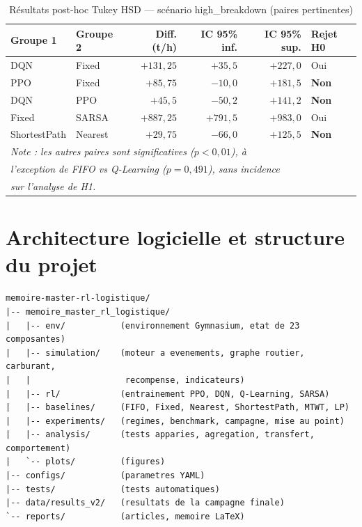\documentclass[11pt,a4paper]{report}
\begin{document}
\begin{table}[H]
\centering
\caption{Résultats post-hoc Tukey HSD — scénario high\_breakdown (paires pertinentes)}
\label{tab:tukey-highbreakdown}
\small
\begin{tabular}{llrrrl}
\toprule
\textbf{Groupe 1} & \textbf{Groupe 2} & \textbf{Diff. (t/h)} & \textbf{IC 95\% inf.} & \textbf{IC 95\% sup.} & \textbf{Rejet H0} \\
\midrule
DQN   & Fixed   & $+131{,}25$ & $+35{,}5$  & $+227{,}0$ & Oui \\
PPO   & Fixed   & $+85{,}75$  & $-10{,}0$  & $+181{,}5$ & \textbf{Non} \\
DQN   & PPO     & $+45{,}5$   & $-50{,}2$  & $+141{,}2$ & \textbf{Non} \\
Fixed & SARSA   & $+887{,}25$ & $+791{,}5$ & $+983{,}0$ & Oui \\
ShortestPath & Nearest & $+29{,}75$ & $-66{,}0$ & $+125{,}5$ & \textbf{Non} \\
\midrule
\multicolumn{6}{l}{\textit{Note : les autres paires sont significatives ($p < 0{,}01$), à}} \\
\multicolumn{6}{l}{\textit{l'exception de FIFO vs Q-Learning ($p = 0{,}491$), sans incidence}} \\
\multicolumn{6}{l}{\textit{sur l'analyse de H1.}} \\
\bottomrule
\end{tabular}
\end{table}

\chapter{Architecture logicielle et structure du projet}
\label{ann:architecture}

\begin{verbatim}
memoire-master-rl-logistique/
|-- memoire_master_rl_logistique/
|   |-- env/           (environnement Gymnasium, etat de 23 composantes)
|   |-- simulation/    (moteur a evenements, graphe routier, carburant,
|   |                   recompense, indicateurs)
|   |-- rl/            (entrainement PPO, DQN, Q-Learning, SARSA)
|   |-- baselines/     (FIFO, Fixed, Nearest, ShortestPath, MTWT, LP)
|   |-- experiments/   (regimes, benchmark, campagne, mise au point)
|   |-- analysis/      (tests apparies, agregation, transfert, comportement)
|   `-- plots/         (figures)
|-- configs/           (parametres YAML)
|-- tests/             (tests automatiques)
|-- data/results_v2/   (resultats de la campagne finale)
`-- reports/           (articles, memoire LaTeX)
\end{verbatim}
\end{document}
